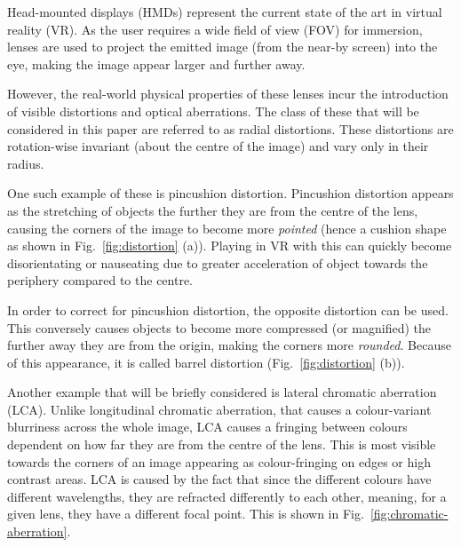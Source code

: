 Head-mounted displays (HMDs) represent the current state of the art in virtual reality (VR).
As the user requires a wide field of view (FOV) for immersion, lenses are used to project the emitted image (from the near-by screen) into the eye, making the image appear larger and further away.

However, the real-world physical properties of these lenses incur the introduction of visible distortions and optical aberrations.
The class of these that will be considered in this paper are referred to as radial distortions.
These distortions are rotation-wise invariant (about the centre of the image) and vary only in their radius.

One such example of these is pincushion distortion.
Pincushion distortion appears as the stretching of objects the further they are from the centre of the lens, causing the corners of the image to become more \textit{pointed} (hence a cushion shape as shown in Fig.~\ref{fig:distortion} (a)).
Playing in VR with this can quickly become disorientating or nauseating due to greater acceleration of object towards the periphery compared to the centre.

In order to correct for pincushion distortion, the opposite distortion can be used.
This conversely causes objects to become more compressed (or magnified) the further away they are from the origin, making the corners more \textit{rounded}.
Because of this appearance, it is called barrel distortion (Fig.~\ref{fig:distortion} (b)).

Another example that will be briefly considered is lateral chromatic aberration (LCA).
Unlike longitudinal chromatic aberration, that causes a colour-variant blurriness across the whole image, LCA causes a fringing between colours dependent on how far they are from the centre of the lens.
This is most visible towards the corners of an image appearing as colour-fringing on edges or high contrast areas.
LCA is caused by the fact that since the different colours have different wavelengths, they are refracted differently to each other, meaning, for a given lens, they have a different focal point.
This is shown in Fig.~\ref{fig:chromatic-aberration}.


